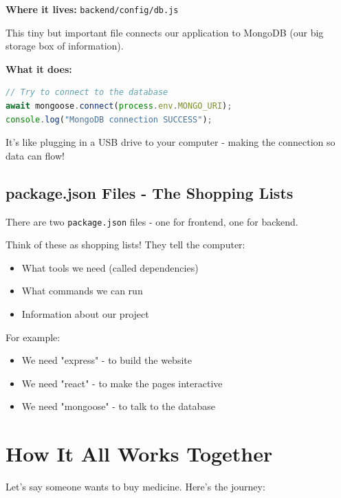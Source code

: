 \documentclass[12pt]{article}
\begin{document}
\textbf{Where it lives:} \texttt{backend/config/db.js}

This tiny but important file connects our application to MongoDB (our big storage box of information).

\textbf{What it does:}
\begin{lstlisting}[language=JavaScript]
// Try to connect to the database
await mongoose.connect(process.env.MONGO_URI);
console.log("MongoDB connection SUCCESS");
\end{lstlisting}

It's like plugging in a USB drive to your computer - making the connection so data can flow!

\subsection{package.json Files - The Shopping Lists}

There are two \texttt{package.json} files - one for frontend, one for backend.

Think of these as shopping lists! They tell the computer:
\begin{itemize}
    \item What tools we need (called dependencies)
    \item What commands we can run
    \item Information about our project
\end{itemize}

For example:
\begin{itemize}
    \item We need "express" - to build the website
    \item We need "react" - to make the pages interactive
    \item We need "mongoose" - to talk to the database
\end{itemize}

\section{How It All Works Together}

Let's say someone wants to buy medicine. Here's the journey:
\end{document}
